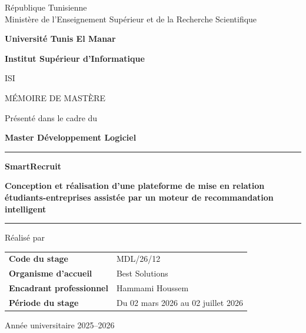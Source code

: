 \hypersetup{pageanchor=false}
\begin{titlepage}
\thispagestyle{empty}
\centering
{\small République Tunisienne\\Ministère de l'Enseignement Supérieur et de la Recherche Scientifique\par}
\vspace{0.5cm}
{\large\bfseries Université Tunis El Manar\par}
{\Large\sffamily\bfseries\color{navy}Institut Supérieur d'Informatique\par}
{\large ISI\par}
\vspace{0.8cm}
{\Large\sffamily MÉMOIRE DE MASTÈRE\par}
\vspace{0.15cm}
{\normalsize Présenté dans le cadre du\par}
{\large\bfseries Master Développement Logiciel\par}
\vspace{0.75cm}
{\color{teal}\rule{\textwidth}{1.2pt}\par}
\vspace{0.35cm}
{\Huge\sffamily\bfseries\color{navy}SmartRecruit\par}
\vspace{0.35cm}
{\Large\bfseries Conception et réalisation d'une plateforme de mise en relation étudiants-entreprises assistée par un moteur de recommandation intelligent\par}
\vspace{0.4cm}
{\color{teal}\rule{\textwidth}{1.2pt}\par}
\vspace{0.65cm}
{\normalsize Réalisé par\par}
{\LARGE\bfseries\nomEtudiante\par}
\vspace{0.65cm}
\begin{tabularx}{0.94\textwidth}{@{}P{5.3cm}Y@{}}
\textbf{Code du stage} & MDL/26/12\\
\textbf{Organisme d'accueil} & Best Solutions\\
\textbf{Encadrant professionnel} & Hammami Houssem\\
\textbf{Période du stage} & Du 02 mars 2026 au 02 juillet 2026\\
\end{tabularx}
\vfill
{\normalsize Année universitaire 2025--2026\par}
\end{titlepage}
\hypersetup{pageanchor=true}
